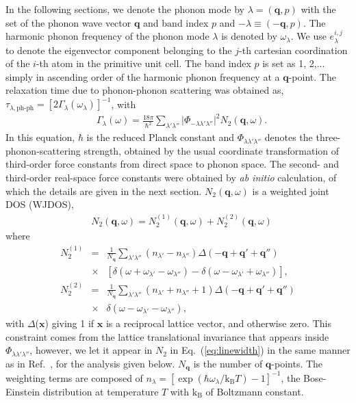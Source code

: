 \documentclass[twocolumn,amsmath,amssymb,a4paper,prb,superscriptaddress,floatfix]{revtex4-1}
\begin{document}
In the following sections, we denote the phonon mode by $\lambda=(\mathbf{q},p)$
with the set of the phonon wave vector $\mathbf{q}$ and band index $p$ and
$-\lambda \equiv (-\mathbf{q},p)$.  The harmonic phonon frequency of the phonon
mode $\lambda$ is denoted by  $\omega_\lambda$. 
We use $e_\lambda^{i,j}$ to denote the eigenvector component
belonging to the $j$-th cartesian coordination of the $i$-th atom in the primitive unit cell.
The band index $p$ is set as 1, 2,... simply in ascending order
of the harmonic phonon frequency at a $\mathbf{q}$-point.  The relaxation time
due to phonon-phonon scattering was obtained as,
$\tau_{\lambda,\text{ph-ph}}=[2\Gamma_\lambda(\omega_\lambda)]^{-1}$, with
\begin{align}
 \label{eq:linewidth}
 &\Gamma_\lambda(\omega) = \frac{18\pi}{\hbar^2}
  \sum_{\lambda' \lambda''}
  \bigl|\Phi_{-\lambda\lambda'\lambda''}\bigl|^2 N_2(\mathbf{q},\omega).
\end{align}
In this equation, $\hbar$ is the reduced Planck constant and
$\Phi_{\lambda\lambda'\lambda''}$ denotes the three-phonon-scattering strength,
obtained by the usual coordinate transformation of third-order force constants
from direct space to phonon space.\cite{phono3py} The second- and third-order
real-space force constants were obtained by {\it ab initio} calculation, of
which the details are given in the next section. $N_2(\mathbf{q},\omega)$ is a
weighted joint DOS (WJDOS)\cite{phono3py},
\begin{align}
 \label{eq:jdos}
 &N_2(\mathbf{q},\omega) = N_2^{(1)}(\mathbf{q},\omega) +  N_2^{(2)}(\mathbf{q},\omega)
\end{align}
where 
\begin{eqnarray*}
	N_2^{(1)} & = & \frac{1}{N_\mathbf{q}} \sum_{\lambda'\lambda''}(n_{\lambda'}-n_{\lambda''})\Delta(-\mathbf{q} + \mathbf{q'} + \mathbf{q''}) \nonumber \\
								   & \times & [\delta(\omega + \omega_{\lambda'} - \omega_{\lambda''}) - \delta(\omega - \omega_{\lambda'} + \omega_{\lambda''})],\\
	N_2^{(2)} & = & \frac{1}{N_\mathbf{q}} \sum_{\lambda'\lambda''}(n_{\lambda'} + n_{\lambda''}+1)\Delta(-\mathbf{q} + \mathbf{q'} + \mathbf{q''}) \nonumber \\
								   & \times & \delta(\omega - \omega_{\lambda'} - \omega_{\lambda''}),
\end{eqnarray*}
with $\Delta$($\mathbf{x}$) giving 1 if $\mathbf{x}$ is a reciprocal lattice
vector, and otherwise zero. This constraint comes from the lattice
translational invariance that appears inside
$\Phi_{\lambda\lambda'\lambda''}$,\cite{phono3py} however, we let it appear in
$N_2$ in Eq.~(\ref{eq:linewidth}) in the same manner as in
Ref.~, for the analysis given below. $N_\mathbf{q}$
is the number of $\mathbf{q}$-points. The weighting terms are composed of
$n_\lambda=[\exp(\hbar\omega_\lambda/\mathrm{k_B}T)-1]^{-1}$, the Bose-Einstein
distribution at temperature $T$ with $\mathrm{k_B}$ of Boltzmann constant.
\end{document}
